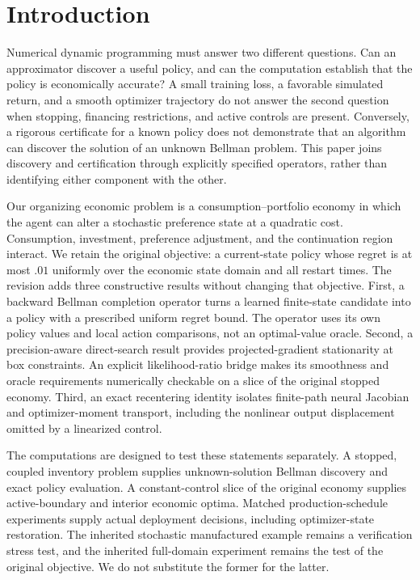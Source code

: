 \section{Introduction}\label{sec:intro28}
Numerical dynamic programming must answer two different questions. Can an approximator discover a useful policy, and can the computation establish that the policy is economically accurate? A small training loss, a favorable simulated return, and a smooth optimizer trajectory do not answer the second question when stopping, financing restrictions, and active controls are present. Conversely, a rigorous certificate for a known policy does not demonstrate that an algorithm can discover the solution of an unknown Bellman problem. This paper joins discovery and certification through explicitly specified operators, rather than identifying either component with the other.

Our organizing economic problem is a consumption--portfolio economy in which the agent can alter a stochastic preference state at a quadratic cost. Consumption, investment, preference adjustment, and the continuation region interact. We retain the original objective: a current-state policy whose regret is at most $.01$ uniformly over the economic state domain and all restart times. The revision adds three constructive results without changing that objective. First, a backward Bellman completion operator turns a learned finite-state candidate into a policy with a prescribed uniform regret bound. The operator uses its own policy values and local action comparisons, not an optimal-value oracle. Second, a precision-aware direct-search result provides projected-gradient stationarity at box constraints. An explicit likelihood-ratio bridge makes its smoothness and oracle requirements numerically checkable on a slice of the original stopped economy. Third, an exact recentering identity isolates finite-path neural Jacobian and optimizer-moment transport, including the nonlinear output displacement omitted by a linearized control.

The computations are designed to test these statements separately. A stopped, coupled inventory problem supplies unknown-solution Bellman discovery and exact policy evaluation. A constant-control slice of the original economy supplies active-boundary and interior economic optima. Matched production-schedule experiments supply actual deployment decisions, including optimizer-state restoration. The inherited stochastic manufactured example remains a verification stress test, and the inherited full-domain experiment remains the test of the original objective. We do not substitute the former for the latter.

